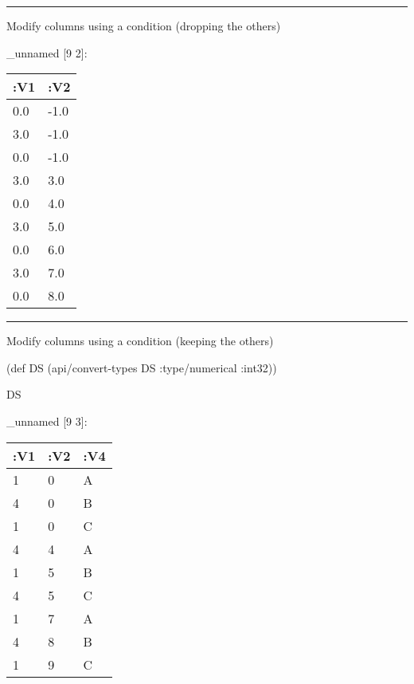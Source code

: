 \documentclass[]{article}
\newenvironment{Shaded}{\begin{snugshade}}{\end{snugshade}}
\newcommand{\AttributeTok}[1]{\textcolor[rgb]{0.77,0.63,0.00}{#1}}
\newcommand{\BuiltInTok}[1]{#1}
\newcommand{\DecValTok}[1]{\textcolor[rgb]{0.00,0.00,0.81}{#1}}
\newcommand{\FunctionTok}[1]{\textcolor[rgb]{0.00,0.00,0.00}{#1}}
\newcommand{\KeywordTok}[1]{\textcolor[rgb]{0.13,0.29,0.53}{\textbf{#1}}}
\newcommand{\NormalTok}[1]{#1}
\newcommand{\VariableTok}[1]{\textcolor[rgb]{0.00,0.00,0.00}{#1}}
\begin{document}
\begin{center}\rule{0.5\linewidth}{0.5pt}\end{center}

Modify columns using a condition (dropping the others)

\begin{Shaded}
\end{Shaded}

\_unnamed {[}9 2{]}:

\begin{longtable}[]{@{}ll@{}}
\toprule
:V1 & :V2\tabularnewline
\midrule
\endhead
0.0 & -1.0\tabularnewline
3.0 & -1.0\tabularnewline
0.0 & -1.0\tabularnewline
3.0 & 3.0\tabularnewline
0.0 & 4.0\tabularnewline
3.0 & 5.0\tabularnewline
0.0 & 6.0\tabularnewline
3.0 & 7.0\tabularnewline
0.0 & 8.0\tabularnewline
\bottomrule
\end{longtable}

\begin{center}\rule{0.5\linewidth}{0.5pt}\end{center}

Modify columns using a condition (keeping the others)

\begin{Shaded}
\begin{Highlighting}[]
\NormalTok{(}\BuiltInTok{def}\FunctionTok{ DS }\NormalTok{(api/convert-types DS }\AttributeTok{:type/numerical} \AttributeTok{:int32}\NormalTok{))}
\end{Highlighting}
\end{Shaded}

\begin{Shaded}
\begin{Highlighting}[]
\NormalTok{DS}
\end{Highlighting}
\end{Shaded}

\_unnamed {[}9 3{]}:

\begin{longtable}[]{@{}lll@{}}
\toprule
:V1 & :V2 & :V4\tabularnewline
\midrule
\endhead
1 & 0 & A\tabularnewline
4 & 0 & B\tabularnewline
1 & 0 & C\tabularnewline
4 & 4 & A\tabularnewline
1 & 5 & B\tabularnewline
4 & 5 & C\tabularnewline
1 & 7 & A\tabularnewline
4 & 8 & B\tabularnewline
1 & 9 & C\tabularnewline
\bottomrule
\end{longtable}
\end{document}
